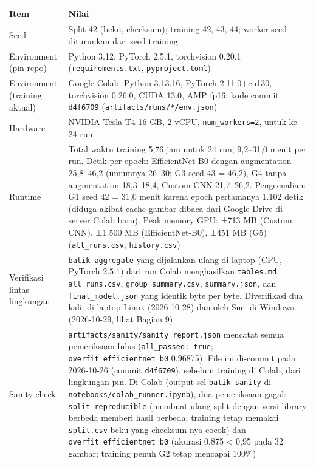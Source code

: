 \documentclass[10pt,a4paper]{article}
\newcounter{none} %
\begin{document}
{\def\LTcaptype{none} %
\begin{longtable}[]{@{}
  >{\raggedright\arraybackslash}p{}
  >{\raggedright\arraybackslash}p{}@{}}
\toprule\noalign{}
\begin{minipage}[b]{\linewidth}\raggedright
Item
\end{minipage} & \begin{minipage}[b]{\linewidth}\raggedright
Nilai
\end{minipage} \\
\midrule\noalign{}
\endhead
\bottomrule\noalign{}
\endlastfoot
Seed & Split 42 (beku, checksum); training 42, 43, 44; worker seed diturunkan dari seed training \\
Environment (pin repo) & Python 3.12, PyTorch 2.5.1, torchvision 0.20.1 (\texttt{requirements.txt}, \texttt{pyproject.toml}) \\
Environment (training aktual) & Google Colab: Python 3.13.16, PyTorch 2.11.0+cu130, torchvision 0.26.0, CUDA 13.0, AMP fp16; kode commit \texttt{d4f6709} (\texttt{artifacts/\allowbreak{}runs/\allowbreak{}*/\allowbreak{}env.json}) \\
Hardware & NVIDIA Tesla T4 16 GB, 2 vCPU, \texttt{num\_\allowbreak{}workers=2}, untuk ke-24 run \\
Runtime & Total waktu training 5,76 jam untuk 24 run; 9,2--31,0 menit per run. Detik per epoch: EfficientNet-B0 dengan augmentation 25,8--46,2 (umumnya 26--30; G3 seed 43 = 46,2), G4 tanpa augmentation 18,3--18,4, Custom CNN 21,7--26,2. Pengecualian: G1 seed 42 = 31,0 menit karena epoch pertamanya 1.102 detik (diduga akibat cache gambar dibaca dari Google Drive di server Colab baru). Peak memory GPU: ±713 MB (Custom CNN), ±1.500 MB (EfficientNet-B0), ±451 MB (G5) (\texttt{all\_\allowbreak{}runs.csv}, \texttt{history.csv}) \\
Verifikasi lintas lingkungan & \texttt{batik\ aggregate} yang dijalankan ulang di laptop (CPU, PyTorch 2.5.1) dari run Colab menghasilkan \texttt{tables.md}, \texttt{all\_\allowbreak{}runs.csv}, \texttt{group\_\allowbreak{}summary.csv}, \texttt{summary.json}, dan \texttt{final\_\allowbreak{}model.json} yang identik byte per byte. Diverifikasi dua kali: di laptop Linux (2026-10-28) dan oleh Suci di Windows (2026-10-29, lihat Bagian 9) \\
Sanity check & \texttt{artifacts/\allowbreak{}sanity/\allowbreak{}sanity\_\allowbreak{}report.json} mencatat semua pemeriksaan lulus (\texttt{all\_passed:\ true}; \texttt{overfit\_\allowbreak{}efficientnet\_\allowbreak{}b0} 0,96875). File ini di-commit pada 2026-10-26 (commit \texttt{d4f6709}), sebelum training di Colab, dari lingkungan pin. Di Colab (output sel \texttt{batik\ sanity} di \texttt{notebooks/\allowbreak{}colab\_\allowbreak{}runner.ipynb}), dua pemeriksaan gagal: \texttt{split\_\allowbreak{}reproducible} (membuat ulang split dengan versi library berbeda memberi hasil berbeda; training tetap memakai \texttt{split.csv} beku yang checksum-nya cocok) dan \texttt{overfit\_\allowbreak{}efficientnet\_\allowbreak{}b0} (akurasi 0,875 \textless{} 0,95 pada 32 gambar; training penuh G2 tetap mencapai 100\%) \\

\end{longtable}}
\end{document}
